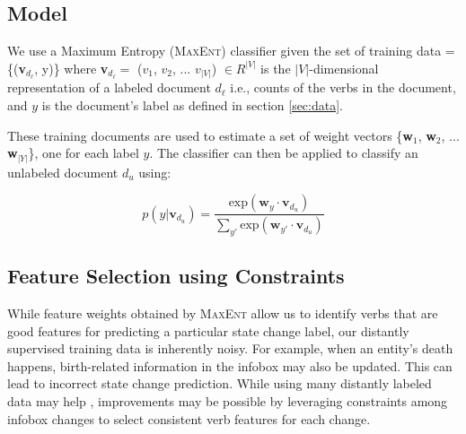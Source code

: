 
\subsection{Model}
We use a Maximum Entropy (\textsc{MaxEnt}) classifier given the set of training data = \{(\textbf{v}$_{d_{\ell}}$, y)\} where \textbf{v}$_{d_{\ell}} =$ ($v_1$, $v_2$, ... $v_{|V|}$) $\in R^{|V|}$ is the $|V|$-dimensional representation of a labeled document $d_{\ell}$ i.e., counts of the verbs in the document, and $y$ is the document's label as defined in section \ref{sec:data}.

These training documents are used to estimate a set of weight vectors \{\textbf{w}$_1$, \textbf{w}$_2$, ... \textbf{w}$_{|Y|}$\}, one for each label $y$. The classifier can then be applied to classify an unlabeled document $d_{\textit{u}}$ using: 

 \begin{equation}
	p(y|\textbf{v}_{d_{\textit{u}}}) = \frac{\mathrm{exp}  (\textbf{w}_{y} \cdot \textbf{v}_{d_{\textit{u}}})}{\sum_{y'} \mathrm{exp} (\textbf{w}_{y'} \cdot \textbf{v}_{d_{\textit{u}}})} \label{eqn:maxent}
\end{equation}

\subsection{Feature Selection using Constraints}

While feature weights obtained by \textsc{MaxEnt} allow us to identify verbs that are good features for predicting a particular state change label, our distantly supervised training data is inherently noisy. %
For example, when an entity's death happens, birth-related information in the infobox may also be updated. This can lead to incorrect state change prediction. While using many distantly labeled data may help%
, improvements may be possible by leveraging constraints among infobox changes to select consistent verb features for each change. 


